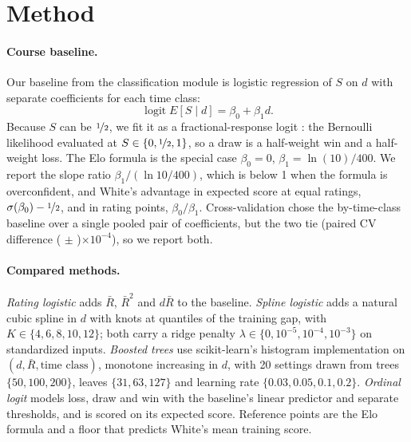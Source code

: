 \documentclass{article}
\newcommand{\tenm}{$\times 10^{-4}$}
\begin{document}
\section{Method}

\paragraph{Course baseline.} Our baseline from the classification module is logistic regression \citep{islr} of $S$ on $d$ with separate coefficients for each time class:
\begin{equation}
  \operatorname{logit} E[S \mid d] = \beta_0 + \beta_1 d .
  \label{eq:logit}
\end{equation}
Because $S$ can be $\nicefrac{1}{2}$, we fit it as a fractional-response logit \citep{papke1996}: the Bernoulli likelihood evaluated at $S \in \{0, \nicefrac{1}{2}, 1\}$, so a draw is a half-weight win and a half-weight loss. The Elo formula is the special case $\beta_0 = 0$, $\beta_1 = \ln(10)/400$. We report the slope ratio $\beta_1/(\ln 10/400)$, which is below 1 when the formula is overconfident, and White's advantage in expected score at equal ratings, $\sigma(\beta_0) - \nicefrac{1}{2}$, and in rating points, $\beta_0/\beta_1$. Cross-validation chose the by-time-class baseline over a single pooled pair of coefficients, but the two tie (paired CV difference (\cvPooledDiff{} $\pm$ \cvPooledSE{})\tenm{}), so we report both.

\paragraph{Compared methods.} \emph{Rating logistic} adds $\bar R$, $\bar R^2$ and $d\bar R$ to the baseline. \emph{Spline logistic} adds a natural cubic spline in $d$ \citep{hastie2009} with knots at quantiles of the training gap, with $K \in \{4,6,8,10,12\}$; both carry a ridge penalty $\lambda \in \{0, 10^{-5}, 10^{-4}, 10^{-3}\}$ on standardized inputs. \emph{Boosted trees} \citep{friedman2001,ke2017} use scikit-learn's histogram implementation \citep{pedregosa2011} on $(d, \bar R, \text{time class})$, monotone increasing in $d$, with 20 settings drawn from trees $\{50,100,200\}$, leaves $\{31,63,127\}$ and learning rate $\{0.03, 0.05, 0.1, 0.2\}$. \emph{Ordinal logit} models loss, draw and win with the baseline's linear predictor and separate thresholds, and is scored on its expected score. Reference points are the Elo formula and a floor that predicts White's mean training score.
\end{document}
